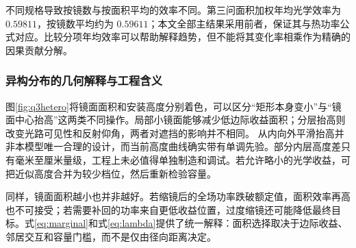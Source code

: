 不同规格导致按镜数与按面积平均的效率不同。第三问面积加权年均光学效率为 $0.59811$，按镜数平均约为 $0.59611$；本文全部主结果采用前者，保证其与热功率公式对应。比较分项年均效率可以帮助解释趋势，但不能将其变化率相乘作为精确的因果贡献分解。

\pagepart
\subsubsection{异构分布的几何解释与工程含义}
图\ref{fig:q3hetero}将镜面面积和安装高度分别着色，可以区分“矩形本身变小”与“镜面中心抬高”这两类不同操作。局部小镜面能够减少低边际收益面积；分层抬高则改变光路可见性和反射仰角，两者对遮挡的影响并不相同。
从内向外平滑抬高并非本模型唯一合理的设计，而当前高度曲线确实带有单调先验。部分内层高度差只有毫米至厘米量级，工程上未必值得单独制造和调试。若允许略小的光学收益，可把近似高度合并为较少档位，然后重新检验容量。

同样，镜面面积越小也并非越好。若缩镜后的全场功率跌破额定值，面积效率再高也不可接受；若需要补回的功率来自更低收益位置，过度缩镜还可能降低最终目标。式\eqref{eq:marginal}和式\eqref{eq:lambda}提供了统一解释：面积选择取决于边际收益、邻居交互和容量门槛，而不是仅由径向距离决定。
\pagepart
